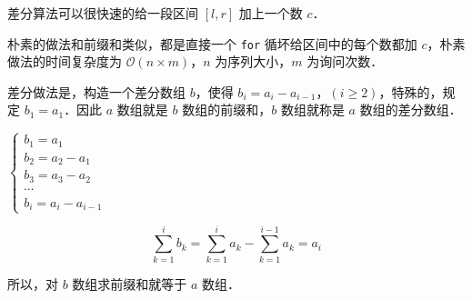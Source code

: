 
差分算法可以很快速的给一段区间 $[l, r]$ 加上一个数 $c$．

朴素的做法和前缀和类似，都是直接一个 \verb|for| 循坏给区间中的每个数都加 $c$，朴素做法的时间复杂度为 $\mathcal{O}(n \times m)$，$n$ 为序列大小，$m$ 为询问次数．

差分做法是，构造一个差分数组 $b$，使得 $b_i = a_i - a_{i - 1}$，$(i \geq 2)$，特殊的，规定 $b_1 = a_1$．因此 $a$ 数组就是 $b$ 数组的前缀和，$b$ 数组就称是 $a$ 数组的差分数组．

$\begin{cases}
b_1 = a_1 \\
b_2 = a_2 - a_1 \\
b_3 = a_3 - a_2 \\
\cdots \\
b_i = a_i - a_{i - 1}
\end{cases}$

\begin{equation}
\sum^i_{k = 1}b_k = \sum^{i}_{k = 1} a_k - \sum^{i - 1}_{k = 1} a_k = a_i
\end{equation}

所以，对 $b$ 数组求前缀和就等于 $a$ 数组．

